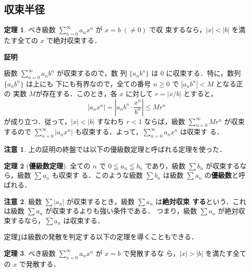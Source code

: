 \documentclass[10pt, uplatex, dvipdfmx]{jsarticle}
\makeatletter
\renewenvironment{proof}[1][\proofname]{\par
  \pushQED{\qed}%
  \normalfont \topsep6\p@\@plus6\p@\relax
  \trivlist
  \item\relax
  {\bfseries
  #1\@addpunct{.}}\hspace\labelsep\ignorespaces
}{%
  \popQED\endtrivlist\@endpefalse
}
\theoremstyle{definition}
\newtheorem{theorem}{定理}[section]
\newtheorem*{remark}{注意}
\renewcommand{\proofname}{\textbf{証明}}
\numberwithin{equation}{section}
\newcommand{\ds}{\displaystyle}
\makeatother
\begin{document}
\subsection{収束半径}

\begin{theorem}\label{thm:conv-seriese}
  べき級数 $\ds \sum_{n=0}^{\infty} a_n x^n$ が $x=b \; (\neq 0)$ で収
  束するなら，$|x| < |b|$ を満たす全ての $x$ で絶対収束する．
\end{theorem}

\begin{proof}
  級数 $\ds \sum_{n=0}^{\infty} a_n b^n$ が収束するので，数
  列 $\{a_nb^n\}$ は $0$ に収束する．特に，数列 $\{a_n b^n\}$ は上にも
  下にも有界なので，全ての番号 $n \geq 0$ で $|a_n b^n| <M$ となる正の
  実数 $M$が存在する．このとき，各 $x$ に対して $\ds
  r=\left|x/b\right|$ とすると，
  \[
    |a_n x^n| = \left| a_n b^n \cdot \frac{x^n}{b^n}\right| \leq M r^n
  \]
  が成り立つ．従って，$|x| < |b|$ すなわち $r<1$ ならば，級数
  $\ds \sum_{n=0}^{\infty} Mr^n$ が収束するので
  $\ds \sum_{n=0}^{\infty}|a_n x^n|$
  も収束する．よって，$\ds \sum_{n=0}^{\infty} a_n x^n$ は収束す
  る．
\end{proof}

\begin{remark}
上の証明の終盤では以下の優級数定理と呼ばれる定理を使った．
\end{remark}

\begin{theorem}[\textbf{優級数定理}] 全ての $n$ で $0 \leqq a_n \leqq
  b_n$ であり，級数 $\sum b_n$ が収束するなら，級数 $\sum a_n$ も収束す
  る．このような級数 $\sum b_n$ は級数 $\sum a_n$ の\textbf{優級数}と呼ばれる．
\end{theorem}

\begin{remark}
  級数 $\sum |a_n|$ が収束するとき，級数 $\sum a_n$ は\textbf{絶対収束
    する}という．これは級数 $\sum a_n$ が収束するよりも強い条件である．
  つまり，級数 $\sum a_n$ が絶対収束するなら，$\sum a_n$ は収束する．
\end{remark}

定理\ref{thm:conv-seriese}は級数の発散を判定する以下の定理を導くこともできる．

\begin{theorem}\label{thm:div-seriese}
べき級数 $\ds \sum_{n=0}^{\infty} a_n x^n$ が $x=b$ で発散するな
ら，$|x| > |b|$ を満たす全ての $x$ で発散する．
\end{theorem}
\end{document}
